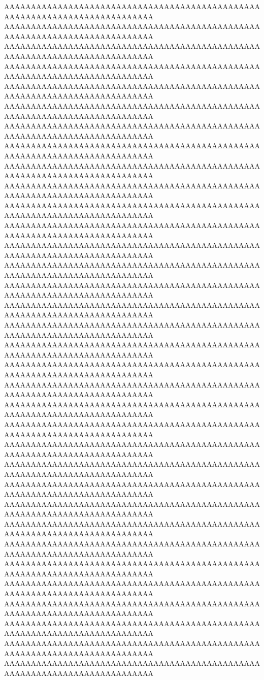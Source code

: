 AAAAAAAAAAAAAAAAAAAAAAAAAAAAAAAAAAAAAAAAAAAAAAAAAAAAAAAAAAAAAAAAAAAAAAAAAAAA
AAAAAAAAAAAAAAAAAAAAAAAAAAAAAAAAAAAAAAAAAAAAAAAAAAAAAAAAAAAAAAAAAAAAAAAAAAAA
AAAAAAAAAAAAAAAAAAAAAAAAAAAAAAAAAAAAAAAAAAAAAAAAAAAAAAAAAAAAAAAAAAAAAAAAAAAA
AAAAAAAAAAAAAAAAAAAAAAAAAAAAAAAAAAAAAAAAAAAAAAAAAAAAAAAAAAAAAAAAAAAAAAAAAAAA
AAAAAAAAAAAAAAAAAAAAAAAAAAAAAAAAAAAAAAAAAAAAAAAAAAAAAAAAAAAAAAAAAAAAAAAAAAAA
AAAAAAAAAAAAAAAAAAAAAAAAAAAAAAAAAAAAAAAAAAAAAAAAAAAAAAAAAAAAAAAAAAAAAAAAAAAA
AAAAAAAAAAAAAAAAAAAAAAAAAAAAAAAAAAAAAAAAAAAAAAAAAAAAAAAAAAAAAAAAAAAAAAAAAAAA
AAAAAAAAAAAAAAAAAAAAAAAAAAAAAAAAAAAAAAAAAAAAAAAAAAAAAAAAAAAAAAAAAAAAAAAAAAAA
AAAAAAAAAAAAAAAAAAAAAAAAAAAAAAAAAAAAAAAAAAAAAAAAAAAAAAAAAAAAAAAAAAAAAAAAAAAA
AAAAAAAAAAAAAAAAAAAAAAAAAAAAAAAAAAAAAAAAAAAAAAAAAAAAAAAAAAAAAAAAAAAAAAAAAAAA
AAAAAAAAAAAAAAAAAAAAAAAAAAAAAAAAAAAAAAAAAAAAAAAAAAAAAAAAAAAAAAAAAAAAAAAAAAAA
AAAAAAAAAAAAAAAAAAAAAAAAAAAAAAAAAAAAAAAAAAAAAAAAAAAAAAAAAAAAAAAAAAAAAAAAAAAA
AAAAAAAAAAAAAAAAAAAAAAAAAAAAAAAAAAAAAAAAAAAAAAAAAAAAAAAAAAAAAAAAAAAAAAAAAAAA
AAAAAAAAAAAAAAAAAAAAAAAAAAAAAAAAAAAAAAAAAAAAAAAAAAAAAAAAAAAAAAAAAAAAAAAAAAAA
AAAAAAAAAAAAAAAAAAAAAAAAAAAAAAAAAAAAAAAAAAAAAAAAAAAAAAAAAAAAAAAAAAAAAAAAAAAA
AAAAAAAAAAAAAAAAAAAAAAAAAAAAAAAAAAAAAAAAAAAAAAAAAAAAAAAAAAAAAAAAAAAAAAAAAAAA
AAAAAAAAAAAAAAAAAAAAAAAAAAAAAAAAAAAAAAAAAAAAAAAAAAAAAAAAAAAAAAAAAAAAAAAAAAAA
AAAAAAAAAAAAAAAAAAAAAAAAAAAAAAAAAAAAAAAAAAAAAAAAAAAAAAAAAAAAAAAAAAAAAAAAAAAA
AAAAAAAAAAAAAAAAAAAAAAAAAAAAAAAAAAAAAAAAAAAAAAAAAAAAAAAAAAAAAAAAAAAAAAAAAAAA
AAAAAAAAAAAAAAAAAAAAAAAAAAAAAAAAAAAAAAAAAAAAAAAAAAAAAAAAAAAAAAAAAAAAAAAAAAAA
AAAAAAAAAAAAAAAAAAAAAAAAAAAAAAAAAAAAAAAAAAAAAAAAAAAAAAAAAAAAAAAAAAAAAAAAAAAA
AAAAAAAAAAAAAAAAAAAAAAAAAAAAAAAAAAAAAAAAAAAAAAAAAAAAAAAAAAAAAAAAAAAAAAAAAAAA
AAAAAAAAAAAAAAAAAAAAAAAAAAAAAAAAAAAAAAAAAAAAAAAAAAAAAAAAAAAAAAAAAAAAAAAAAAAA
AAAAAAAAAAAAAAAAAAAAAAAAAAAAAAAAAAAAAAAAAAAAAAAAAAAAAAAAAAAAAAAAAAAAAAAAAAAA
AAAAAAAAAAAAAAAAAAAAAAAAAAAAAAAAAAAAAAAAAAAAAAAAAAAAAAAAAAAAAAAAAAAAAAAAAAAA
AAAAAAAAAAAAAAAAAAAAAAAAAAAAAAAAAAAAAAAAAAAAAAAAAAAAAAAAAAAAAAAAAAAAAAAAAAAA
AAAAAAAAAAAAAAAAAAAAAAAAAAAAAAAAAAAAAAAAAAAAAAAAAAAAAAAAAAAAAAAAAAAAAAAAAAAA
AAAAAAAAAAAAAAAAAAAAAAAAAAAAAAAAAAAAAAAAAAAAAAAAAAAAAAAAAAAAAAAAAAAAAAAAAAAA
AAAAAAAAAAAAAAAAAAAAAAAAAAAAAAAAAAAAAAAAAAAAAAAAAAAAAAAAAAAAAAAAAAAAAAAAAAAA
AAAAAAAAAAAAAAAAAAAAAAAAAAAAAAAAAAAAAAAAAAAAAAAAAAAAAAAAAAAAAAAAAAAAAAAAAAAA
AAAAAAAAAAAAAAAAAAAAAAAAAAAAAAAAAAAAAAAAAAAAAAAAAAAAAAAAAAAAAAAAAAAAAAAAAAAA
AAAAAAAAAAAAAAAAAAAAAAAAAAAAAAAAAAAAAAAAAAAAAAAAAAAAAAAAAAAAAAAAAAAAAAAAAAAA
AAAAAAAAAAAAAAAAAAAAAAAAAAAAAAAAAAAAAAAAAAAAAAAAAAAAAAAAAAAAAAAAAAAAAAAAAAAA
AAAAAAAAAAAAAAAAAAAAAAAAAAAAAAAAAAAAAAAAAAAAAAAAAAAAAAAAAAAAAAAAAAAAAAAAAAAA
